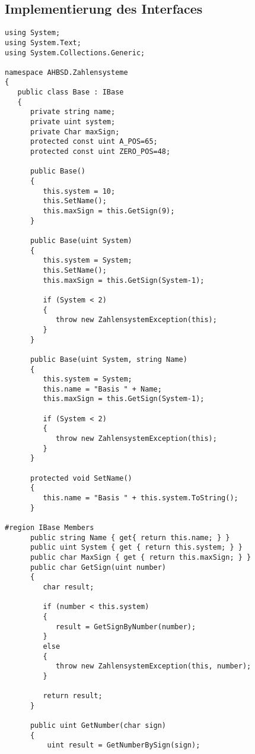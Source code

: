 \subsection{Implementierung des Interfaces}
\label{listing:C_sharp:Implementierung}
\begin{lstlisting}
using System;
using System.Text;
using System.Collections.Generic;

namespace AHBSD.Zahlensysteme
{
   public class Base : IBase
   {
      private string name;
      private uint system;
      private Char maxSign;
      protected const uint A_POS=65;
      protected const uint ZERO_POS=48;
      
      public Base()
      {
         this.system = 10;
         this.SetName();
         this.maxSign = this.GetSign(9);
      }
      
      public Base(uint System)
      {
         this.system = System;
         this.SetName();
         this.maxSign = this.GetSign(System-1);
         
         if (System < 2)
         {
            throw new ZahlensystemException(this);
         }
      }
      
      public Base(uint System, string Name)
      {
         this.system = System;
         this.name = "Basis " + Name;
         this.maxSign = this.GetSign(System-1);
         
         if (System < 2)
         {
            throw new ZahlensystemException(this);
         }
      }
      
      protected void SetName()
      {
         this.name = "Basis " + this.system.ToString();
      }
      
#region IBase Members
      public string Name { get{ return this.name; } }
      public uint System { get { return this.system; } }
      public char MaxSign { get { return this.maxSign; } }
      public char GetSign(uint number)
      {
         char result;
         
         if (number < this.system)
         {
            result = GetSignByNumber(number);
         }
         else
         {
            throw new ZahlensystemException(this, number);
         }
         
         return result;
      }
      
      public uint GetNumber(char sign)
      {
          uint result = GetNumberBySign(sign);
          

\end{lstlisting}
